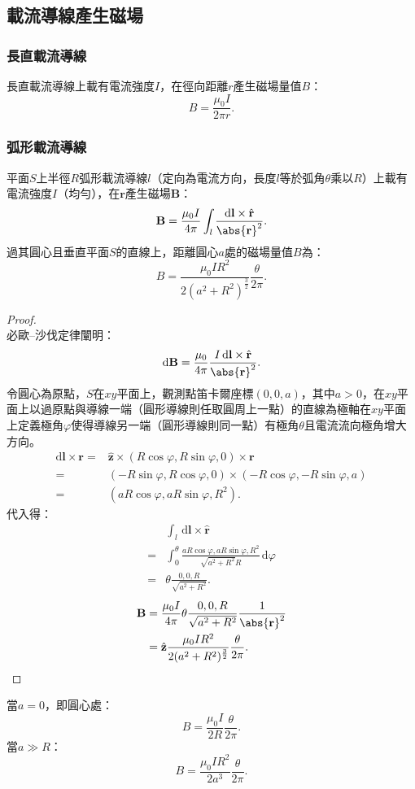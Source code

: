 \documentclass[a4paper,12pt]{report}
\begin{document}
\begin{itemize}
\subsection{載流導線產生磁場}
\subsubsection{長直載流導線}
長直載流導線上載有電流強度$I$，在徑向距離$r$產生磁場量值$B$：
\[B=\frac{\mu_0I}{2\pi r}.\]
\subsubsection{弧形載流導線}
平面$S$上半徑$R$弧形載流導線$l$（定向為電流方向，長度$l$等於弧角$\theta$乘以$R$）上載有電流強度$I$（均勻），在$\mathbf{r}$產生磁場$\mathbf{B}$：
\[\mathbf{B}=\frac{\mu_0I}{4\pi}\int_{l}\frac{\mathrm{d}\mathbf{l}\times\hat{\mathbf{r}}}{\abs{\mathbf{r}}^2}.\]
過其圓心且垂直平面$S$的直線上，距離圓心$a$處的磁場量值$B$為：
\[B=\frac{\mu_0IR^2}{2(a^2+R^2)^{\frac{3}{2}}}\frac{\theta}{2\pi}.\]
\begin{proof}\mbox{}\\
必歐–沙伐定律闡明：
\[\mathrm{d}\mathbf{B}=\frac{\mu_0}{4\pi}\frac{I\,\mathrm{d}\mathbf{l}\times\hat{\mathbf{r}}}{\abs{\mathbf{r}}^2}.\]
令圓心為原點，$S$在$xy$平面上，觀測點笛卡爾座標$(0,0,a)$，其中$a>0$，在$xy$平面上以過原點與導線一端（圓形導線則任取圓周上一點）的直線為極軸在$xy$平面上定義極角$\varphi$使得導線另一端（圓形導線則同一點）有極角$\theta$且電流流向極角增大方向。
\[\begin{aligned}
\mathrm{d}\mathbf{l}\times\mathbf{r}=&\hat{\mathbf{z}}\times(R\cos\varphi,R\sin\varphi,0)\times\mathbf{r}\\
=&(-R\sin\varphi,R\cos\varphi,0)\times(-R\cos\varphi,-R\sin\varphi,a)\\
=&(aR\cos\varphi,aR\sin\varphi,R^2).
\end{aligned}\]
代入得：
\[\begin{aligned}
&\int_{l}\,\mathrm{d}\mathbf{l}\times\hat{\mathbf{r}}\\
=&\int_0^{\theta}\frac{aR\cos\varphi,aR\sin\varphi,R^2}{\sqrt{a^2+R^2}R}\,\mathrm{d}\varphi\\
=&\theta\frac{0,0,R}{\sqrt{a^2+R^2}}.
\end{aligned}\]
\[\begin{aligned}
\mathbf{B} &= \frac{\mu_0I}{4\pi}\theta\frac{0,0,R}{\sqrt{a^2+R^2}}\frac{1}{\abs{\mathbf{r}}^2}\\
&=\hat{\mathbf{z}}\frac{\mu_0IR^2}{2(a^2+R^2)^{\frac{3}{2}}}\frac{\theta}{2\pi}.
\end{aligned}\]
\end{proof}
當$a=0$，即圓心處：
\[B=\frac{\mu_0I}{2R}\frac{\theta}{2\pi}.\]
當$a\gg R$：
\[B=\frac{\mu_0IR^2}{2a^3}\frac{\theta}{2\pi}.\]

\end{itemize}
\end{document}
